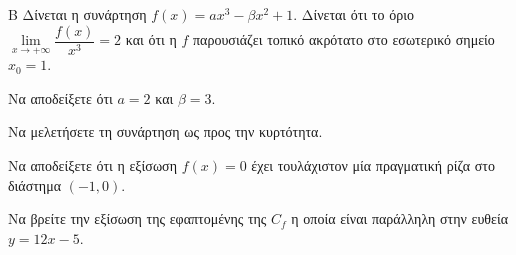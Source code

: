 \begin{thema}{Β}
Δίνεται η συνάρτηση $f(x) = a x^3 - \beta x^2 + 1$. Δίνεται ότι το όριο $\lim\limits_{x\to +\infty}\dfrac{f(x)}{x^3} = 2$ και ότι η $f$ παρουσιάζει τοπικό ακρότατο στο εσωτερικό σημείο $x_0 = 1$.
\begin{erwthma}
  \item Να αποδείξετε ότι $a=2$ και $\beta=3$.
  \item Να μελετήσετε τη συνάρτηση ως προς την κυρτότητα.
  \item Να αποδείξετε ότι η εξίσωση $f(x)=0$ έχει τουλάχιστον μία πραγματική ρίζα στο διάστημα $(-1, 0)$.
  \item Να βρείτε την εξίσωση της εφαπτομένης της $C_f$ η οποία είναι παράλληλη στην ευθεία $y = 12x-5$.
\end{erwthma}
\end{thema}
